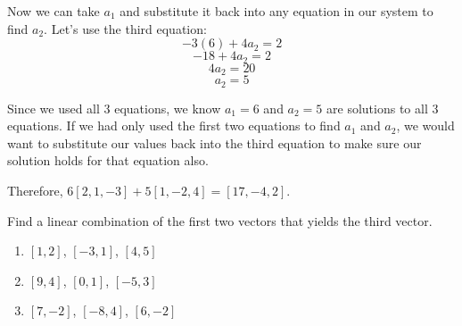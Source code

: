 Now we can take $a_1$ and substitute it back into any equation in our system 
to find $a_2$. Let's use the third equation:
$$-3 \left( 6 \right) + 4 a_2 = 2$$
$$ -18 + 4 a_2 = 2$$
$$4 a_2 = 20$$
$$a_2 = 5$$

Since we used all 3 equations, we know $a_1 = 6$ and $a_2 = 5$ are solutions 
to all 3 equations. If we had only used the first two equations to find $a_1$ 
and $a_2$, we would want to substitute our values back into the third equation 
to make sure our solution holds for that equation also. 

Therefore, $6 \left[ 2, 1, -3 \right] + 5 \left[ 1, -2, 4 \right] = \left[ 17, 
-4, 2 \right]$.

\begin{Exercise}[title = {Linear Combinations}, label = combo]
Find a linear combination of the first two vectors that yields the third 
vector. 
\begin{enumerate}
\item $\left[1, 2 \right]$, $\left[ -3, 1 \right]$, $\left[ 4, 5 \right]$
\item $\left[ 9, 4 \right]$, $\left[ 0, 1 \right]$, $\left[ -5, 3 \right]$
\item $\left[ 7, -2 \right]$, $\left[ -8, 4 \right]$, $\left[ 6, -2 \right]$
\end{enumerate}
\vspace{50mm}
\end{Exercise}

